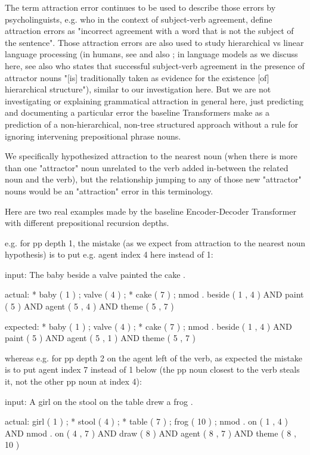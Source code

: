 \documentclass[11pt]{article}
\begin{document}
The term attraction error continues to be used to describe those errors by psycholinguists, e.g. \citep{FRANCK2006173} who in the context of subject-verb agreement, define attraction errors as "incorrect agreement with a word that is not the subject of the sentence".
Those attraction errors are also used to study hierarchical vs linear language processing (in humans, see \citep{FRANCK2006173} and also \citep{VIGLIOCCO1998B13}; in language models as we discuss here, see also \citep{goldberg2019assessingbertssyntacticabilities} who states that successful subject-verb agreement in the presence of attractor nouns  "[is] traditionally taken as evidence for the existence [of] hierarchical structure"), similar to our investigation here. But we are not investigating or explaining grammatical attraction in general here, just predicting and documenting a particular error the baseline Transformers make as a prediction of a non-hierarchical, non-tree structured approach without a rule for ignoring intervening prepositional phrase nouns.

We specifically hypothesized attraction to the nearest noun (when there is more than one "attractor" noun unrelated to the verb added in-between the related noun and the verb), but the relationship jumping to any of those new "attractor" nouns would be an "attraction" error in this terminology.

Here are two real examples made by the \citep{Wu2023} baseline Encoder-Decoder Transformer with different prepositional recursion depths.

e.g. for pp depth 1, the mistake (as we expect from attraction to the nearest noun hypothesis) is to put e.g. agent index 4 here instead of 1:

input: The baby beside a valve painted the cake .

actual:   * baby ( 1 ) ; valve ( 4 ) ; * cake ( 7 ) ; nmod . beside ( 1 , 4 ) AND paint ( 5 ) AND agent ( 5 , 4 ) AND theme ( 5 , 7 )

expected: * baby ( 1 ) ; valve ( 4 ) ; * cake ( 7 ) ; nmod . beside ( 1 , 4 ) AND paint ( 5 ) AND agent ( 5 , 1 ) AND theme ( 5 , 7 )


whereas e.g. for pp depth 2 on the agent left of the verb, as expected the mistake is to put agent index 7 instead of 1 below (the pp noun closest to the verb steals it, not the other pp noun at index 4):

input: A girl on the stool on the table drew a frog .

actual:   girl ( 1 ) ; * stool ( 4 ) ; * table ( 7 ) ; frog ( 10 ) ; nmod . on ( 1 , 4 ) AND nmod . on ( 4 , 7 ) AND draw ( 8 ) AND agent ( 8 , 7 ) AND theme ( 8 , 10 )
\end{document}
